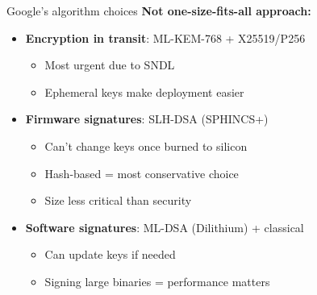 \documentclass[aspectratio=169, lualatex, handout]{beamer}
\begin{document}
\begin{frame}{Google's algorithm choices}
	\textbf{Not one-size-fits-all approach:}
	\begin{itemize}
		\item \textbf{Encryption in transit}: ML-KEM-768 + X25519/P256
		      \begin{itemize}
			      \item Most urgent due to SNDL
			      \item Ephemeral keys make deployment easier
		      \end{itemize}
		\item \textbf{Firmware signatures}: SLH-DSA (SPHINCS+)
		      \begin{itemize}
			      \item Can't change keys once burned to silicon
			      \item Hash-based = most conservative choice
			      \item Size less critical than security
		      \end{itemize}
		\item \textbf{Software signatures}: ML-DSA (Dilithium) + classical
		      \begin{itemize}
			      \item Can update keys if needed
			      \item Signing large binaries = performance matters
		      \end{itemize}
	\end{itemize}
\end{frame}
\end{document}

